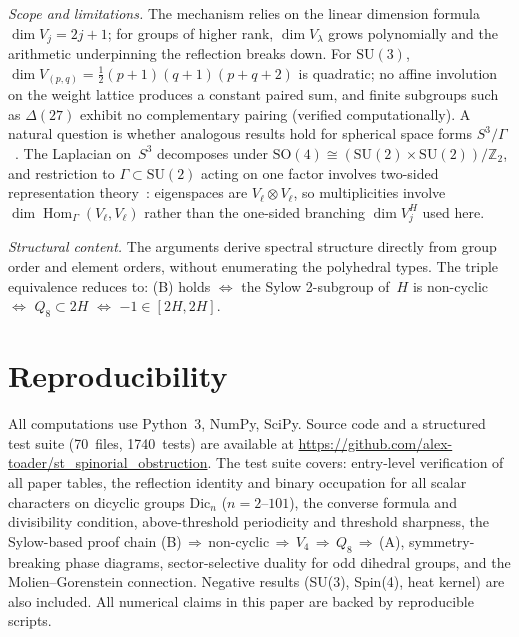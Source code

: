 \documentclass[12pt]{article}
\theoremstyle{definition}
\theoremstyle{remark}
\newcommand{\ZZ}{\mathbb{Z}}
\newcommand{\SU}{\mathrm{SU}}
\newcommand{\SO}{\mathrm{SO}}
\DeclareMathOperator{\Hom}{Hom}
\begin{document}
\emph{Scope and limitations.}
The mechanism relies on the linear dimension formula
$\dim V_j = 2j{+}1$; for groups of higher rank,
$\dim V_\lambda$ grows polynomially and the arithmetic
underpinning the reflection breaks down.
For $\SU(3)$, $\dim V_{(p,q)} = \tfrac{1}{2}(p{+}1)(q{+}1)(p{+}q{+}2)$
is quadratic; no affine involution on the weight lattice
produces a constant paired sum, and finite subgroups such as
$\Delta(27)$ exhibit no complementary pairing
(verified computationally).
A natural question is whether analogous results hold for
spherical space forms $S^3/\Gamma$~\cite{Wolf2011}.
The Laplacian on~$S^3$ decomposes under
$\SO(4) \cong (\SU(2) \times \SU(2))/\ZZ_2$, and
restriction to $\Gamma \subset \SU(2)$ acting on one factor
involves two-sided representation theory~\cite{Ikeda1980}:
eigenspaces are $V_\ell \otimes V_\ell$, so multiplicities
involve $\dim\Hom_\Gamma(V_\ell, V_\ell)$ rather than the
one-sided branching $\dim V_j^H$ used here.

\emph{Structural content.}
The arguments derive spectral structure directly from
group order and element orders, without enumerating
the polyhedral types.
The triple equivalence reduces to:
(B) holds $\Leftrightarrow$ the Sylow 2-subgroup
of~$H$ is non-cyclic $\Leftrightarrow$
$Q_8 \subset 2H$ $\Leftrightarrow$
$-1 \in [2H, 2H]$.

\section*{Reproducibility}

All computations use Python~3, NumPy, SciPy. Source code and a
structured test suite (70~files, 1740~tests) are available at
\url{https://github.com/alex-toader/st_spinorial_obstruction}.
The test suite covers: entry-level verification of all paper tables,
the reflection identity and binary occupation for all scalar characters
on dicyclic groups $\mathrm{Dic}_n$ ($n = 2$--$101$), the converse
formula and divisibility condition, above-threshold periodicity
and threshold sharpness, the Sylow-based proof chain
(B)$\,\Rightarrow\,$non-cyclic$\,\Rightarrow\,V_4\,\Rightarrow\,Q_8\,\Rightarrow\,$(A),
symmetry-breaking phase diagrams, sector-selective duality for odd
dihedral groups, and the Molien--Gorenstein connection.
Negative results (SU(3), Spin(4), heat kernel) are also included.
All numerical claims in this paper are backed by reproducible scripts.
\end{document}
